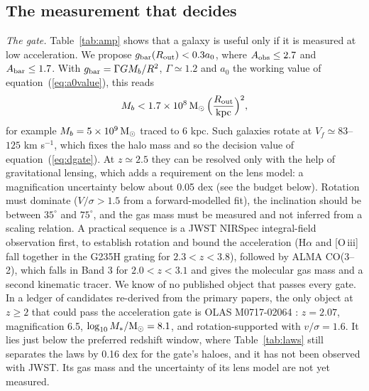 \documentclass[fleqn,usenatbib]{mnras}
\begin{document}
\subsection{The measurement that decides}
\label{sec:design}
\emph{The gate.} Table~\ref{tab:amp} shows that a galaxy is useful only if it is measured at low acceleration. We propose $g_{\rm bar}(R_{\rm out})<0.3a_0$, where $A_{\rm obs}\le2.7$ and $A_{\rm bar}\le1.7$. With $g_{\rm bar}=\Gamma GM_b/R^2$, $\Gamma\simeq1.2$ and $a_0$ the working value of equation~(\ref{eq:a0value}), this reads
\begin{equation}
M_b<1.7\times10^{8}\,{\rm M_\odot}\,\Big(\frac{R_{\rm out}}{\rm kpc}\Big)^2 ,
\end{equation}
for example $M_b=5\times10^{9}\,{\rm M_\odot}$ traced to 6 kpc. Such galaxies rotate at $V_f\simeq83$--$125$ km s$^{-1}$, which fixes the halo mass and so the decision value of equation~(\ref{eq:dgate}). At $z\simeq2.5$ they can be resolved only with the help of gravitational lensing, which adds a requirement on the lens model: a magnification uncertainty below about 0.05 dex (see the budget below). Rotation must dominate ($V/\sigma>1.5$ from a forward-modelled fit), the inclination should be between $35^\circ$ and $75^\circ$, and the gas mass must be measured and not inferred from a scaling relation. A practical sequence is a JWST NIRSpec integral-field observation first, to establish rotation and bound the acceleration (H$\alpha$ and [O\,{\sc iii}] fall together in the G235H grating for $2.3<z<3.8$), followed by ALMA CO(3--2), which falls in Band 3 for $2.0<z<3.1$ and gives the molecular gas mass and a second kinematic tracer. We know of no published object that passes every gate. In a ledger of candidates re-derived from the primary papers, the only object at $z\geq2$ that could pass the acceleration gate is OLAS M0717-02064 \citep{Hirtenstein2019}: $z=2.07$, magnification 6.5, $\log_{10}M_*/{\rm M_\odot}=8.1$, and rotation-supported with $v/\sigma=1.6$. It lies just below the preferred redshift window, where Table~\ref{tab:laws} still separates the laws by 0.16 dex for the gate's haloes, and it has not been observed with JWST. Its gas mass and the uncertainty of its lens model are not yet measured.
\end{document}
